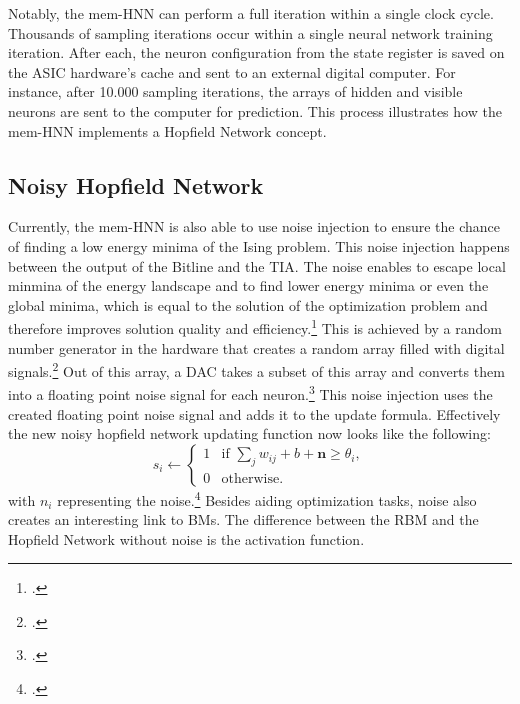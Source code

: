 Notably, the \ac{mem-HNN} can perform a full iteration within a single clock cycle.
Thousands of sampling iterations occur within a single neural network training iteration.
After each, the neuron configuration from the state register is saved on the \ac{ASIC} hardware's cache and sent to an external digital computer.
For instance, after 10.000 sampling iterations, the arrays of hidden and visible neurons are sent to the computer for prediction.
This process illustrates how the \ac{mem-HNN} implements a Hopfield Network concept.

\subsection{Noisy Hopfield Network}

Currently, the \ac{mem-HNN} is also able to use noise injection to ensure the chance of finding a low energy minima of the Ising problem.
This noise injection happens between the output of the Bitline and the \ac{TIA}. 
The noise enables to escape local minmina of the energy landscape and to find lower energy minima or even the global minima, which is equal to the solution of the optimization problem and therefore improves solution quality and efficiency.\footcite[cf.][410]{caiPowerefficientCombinatorialOptimization2020} 
This is achieved by a random number generator in the hardware that creates a random array filled with digital signals.\footcite[cf.][22]{caiHarnessingIntrinsicNoise2019}
Out of this array, a \ac{DAC} takes a subset of this array and converts them into a floating point noise signal for each neuron.\footcite[cf.][3]{hizzaniMemristorbasedHardwareAlgorithms2023}
This noise injection uses the created floating point noise signal and adds it to the update formula.
Effectively the new noisy hopfield network updating function now looks like the following: 
\begin{equation}
    s_i \leftarrow 
    \begin{cases} 
    1 & \text{if } \sum_j w_{ij}  + b + \mathbf{n} \geq \theta_i, \\
    0 & \text{otherwise}.
    \end{cases}
    \label{noisy_update_HNN_formula}
\end{equation}
with \(n_i\) representing the noise.\footcite[cf.][410]{caiPowerefficientCombinatorialOptimization2020} 
Besides aiding optimization tasks, noise also creates an interesting link to \ac{BM}s.
The difference between the \ac{RBM} and the Hopfield Network without noise is the activation function.
